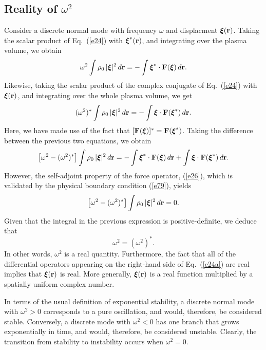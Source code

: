 \documentclass[12pt,prb,aps,notitlepage]{revtex4-1}
\newcommand{\bxi}{\mbox{\boldmath$\xi$}}
\begin{document}
\subsection{Reality of $\omega^2$}
Consider a discrete normal mode with frequency $\omega$ and displacment $\bxi({\bf r})$. 
Taking the scalar product of Eq.~(\ref{e24}) with $\bxi^\ast({\bf r})$, and integrating over the plasma volume, we obtain
\begin{equation}
\omega^2\int\rho_0\,|\bxi|^2\,d{\bf r} = - \int\bxi^\ast\cdot {\bf F}(\bxi)\,d{\bf r}.
\end{equation}
Likewise, taking the scalar product of the complex conjugate of Eq.~(\ref{e24}) with $\bxi({\bf r})$, and integrating over the whole plasma
volume, we get
\begin{equation}
(\omega^2)^\ast\int\rho_0\,|\bxi|^2\,d{\bf r} = - \int\bxi\cdot {\bf F}(\bxi^\ast)\,d{\bf r}.
\end{equation}
Here, we have made use of the fact that $[{\bf F}(\bxi)]^\ast={\bf F}(\bxi^\ast)$. 
Taking the difference between the previous two equations, we obtain
\begin{equation}
\left[\omega^2 - (\omega^2)^\ast\right]\int\rho_0\,|\bxi|^2\,d{\bf r}=  - \int\bxi^\ast\cdot {\bf F}(\bxi)\,d{\bf r}+ \int\bxi\cdot {\bf F}(\bxi^\ast)\,d{\bf r}.
\end{equation}
However, the self-adjoint property of the force operator, (\ref{e26}), which is validated by the physical boundary condition (\ref{e79}), 
yields
\begin{equation}
\left[\omega^2 - (\omega^2)^\ast\right]\int\rho_0\,|\bxi|^2\,d{\bf r}=0.
\end{equation}
Given that the integral in the previous expression is positive-definite, we deduce that 
\begin{equation}
\omega^2 = (\omega^2)^\ast.
\end{equation}
In other words, $\omega^2$ is a real quantity. Furthermore, the fact that all of the differential operators appearing on the right-hand side of
Eq.~(\ref{e24a}) are real implies that $\bxi({\bf r})$ is real. More generally, $\bxi({\bf r})$ is a real function multiplied by a spatially uniform complex
number. 

In terms of the usual definition of exponential stability, a discrete normal mode with $\omega^2>0$ corresponds to a pure oscillation, and would, therefore,
be considered stable. Conversely, a discrete mode with $\omega^2<0$ has one branch that grows exponentially in time, and
would, therefore, be considered unstable. Clearly, the transition from stability to instability occurs when $\omega^2=0$. 
\end{document}

